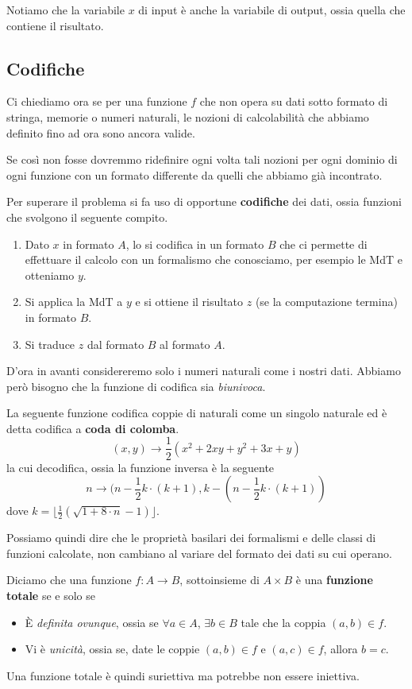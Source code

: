 Notiamo che la variabile $x$ di input è anche la variabile
di output, ossia quella che contiene il risultato.

\subsection{Codifiche}
Ci chiediamo ora se per una funzione $f$ che non opera su
dati sotto formato di stringa, memorie o numeri naturali,
le nozioni di calcolabilità che abbiamo definito fino ad ora
sono ancora valide.

Se così non fosse dovremmo ridefinire ogni volta tali nozioni
per ogni dominio di ogni funzione con un formato differente da
quelli che abbiamo già incontrato.

Per superare il problema si fa uso di opportune
\textbf{codifiche} dei dati, ossia funzioni che svolgono
il seguente compito.
\begin{enumerate}
	\item Dato $x$ in formato $A$, lo si codifica in un formato
	      $B$ che ci permette di effettuare il calcolo con un
	      formalismo che conosciamo, per esempio le MdT e
	      otteniamo $y$.
	\item Si applica la MdT a $y$ e si ottiene il risultato $z$
	      (se la computazione termina) in formato $B$.
	\item Si traduce $z$ dal formato $B$ al formato $A$.
\end{enumerate}
D'ora in avanti considereremo solo i numeri naturali come i
nostri dati. Abbiamo però bisogno che la funzione di codifica
sia \emph{biunivoca}.

\begin{example}
	La seguente funzione codifica coppie di naturali come un
	singolo naturale ed è detta codifica a
	\textbf{coda di colomba}.
	\[ (x, y) \to \frac{1}{2} (x^2 + 2 x y + y^2 + 3 x + y) \]
	la cui decodifica, ossia la funzione inversa è la seguente
	\[
		n \to (n - \frac{1}{2} k \cdot (k + 1),
		k - (n - \frac{1}{2} k \cdot (k + 1))
	\]
	dove $k=\lfloor \frac{1}{2}(\sqrt{1+8\cdot n}-1)\rfloor$.
\end{example}

Possiamo quindi dire che le proprietà basilari dei formalismi
e delle classi di funzioni calcolate, non cambiano al variare
del formato dei dati su cui operano.

\begin{definition} \label{def: funzione totale}
	Diciamo che una funzione $f : A \to B$, sottoinsieme di
	$A \times B$ è una \textbf{funzione totale} se e solo se
	\begin{itemize}
		\item \`E \emph{definita ovunque}, ossia se
		      $\forall a \in A$, $\exists b \in B$ tale che la
		      coppia $(a, b) \in f$.
		\item Vi è \emph{unicità}, ossia se, date le coppie
		      $(a, b) \in f$ e $(a, c) \in f$, allora $b=c$.
	\end{itemize}
	Una funzione totale è quindi suriettiva ma potrebbe non
	essere iniettiva.
\end{definition}


